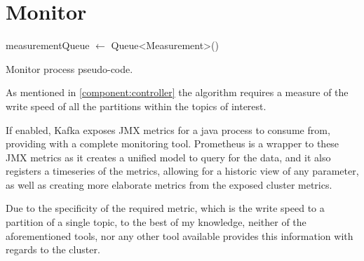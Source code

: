 \section{Monitor}
\label{component:Monitor}

\IncMargin{1em}
\begin{algorithm}[h]
\BlankLine

measurementQueue $\gets$ Queue<Measurement>()\;
\caption{Monitor process pseudo-code.}
\label{algo:monitor}
\end{algorithm}\DecMargin{1em}

As mentioned in \ref{component:controller} the algorithm requires a measure of the write speed of all the partitions within the topics of interest.

If enabled, Kafka exposes JMX metrics for a java process to consume from, providing with a complete monitoring tool. Prometheus is a wrapper to these JMX metrics as it creates a unified model to query for the data, and it also registers a timeseries of the metrics, allowing for a historic view of any parameter, as well as creating more elaborate metrics from the exposed cluster metrics.

Due to the specificity of the required metric, which is the write speed to a partition of a single topic, to the best of my knowledge, neither of the aforementioned tools, nor any other tool available provides this information with regards to the cluster.

